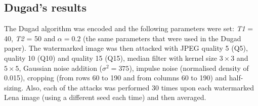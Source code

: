 \documentclass[10pt,twocolumn]{article}
\begin{document}
\subsection{Dugad's results}
\label{sec:dugRes}
The Dugad algorithm was encoded and the following parameters were set: \emph{T1} = 40, \emph{T2} = 50
and $\alpha=0.2$ (the same parameters that were used in the Dugad paper). 
The watermarked image was then attacked with 
JPEG quality 5 (Q5), quality 10 (Q10) and quality 15 (Q15), 
median filter with kernel size $3 \times 3$ and $5 \times 5$, 
Gaussian noise addition ($\sigma^{2}=375$),
impulse noise (normalised density of 0.015),
cropping (from rows 60 to 190 and from columns 60 to 190) and
half-sizing.
Also, each of the attacks was performed 30 times upon each watermarked Lena image (using a different seed each time)
and then averaged. 

\end{document}
